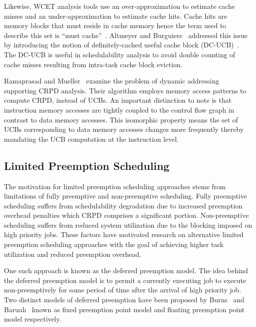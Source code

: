 Likewise, WCET analysis tools use an over-approximation to estimate cache misses and an under-approximation to estimate cache hits.  Cache hits are memory blocks that must reside in cache memory hence the term used to describe this set is “must cache”~\cite{altmeyer:11c}.  Altmeyer and Burguiere~\cite{altmeyer:11c} addressed this issue by introducing the notion of definitely-cached useful cache block (DC-UCB)~\cite{altmeyer:11c}.  The DC-UCB is useful in schedulability analysis to avoid double counting of cache misses resulting from intra-task cache block eviction.

Ramaprasad and Mueller~\cite{ramaprasad:06} examine the problem of dynamic addressing supporting CRPD analysis. Their algorithm employs memory access patterns to compute CRPD, instead of UCBs.  An important distinction to note is that instruction memory accesses are tightly coupled to the control flow graph in contrast to data memory accesses. This isomorphic property means the set of UCBs corresponding to data memory accesses changes more frequently thereby mandating the UCB computation at the instruction level.

\subsection {Limited Preemption Scheduling}\label{sec:lp_related_work}
The motivation for limited preemption scheduling approaches stems from limitations of fully preemptive and non-preemptive scheduling.  Fully preemptive scheduling suffers from schedulability degradation due to increased preemption overhead penalties which CRPD comprises a significant portion.  Non-preemptive scheduling suffers from reduced system utilization due to the blocking imposed on high priority jobs.  These factors have motivated research on alternative limited preemption scheduling approaches with the goal of achieving higher task utilization and reduced preemption overhead.

One such approach is known as the deferred preemption model.  The idea behind the deferred preemption model is to permit a currently executing job to execute non-preemptively for some period of time after the arrival of high priority job.  Two distinct models of deferred preemption have been proposed by Burns~\cite{burns:05} and Baruah~\cite{baruah:05} known as fixed preemption point model and floating preemption point model respectively.

